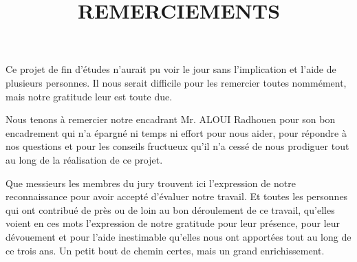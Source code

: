 \documentclass[a4paper,12pt]{report}
\begin{document}
\title{REMERCIEMENTS}


Ce projet de fin d'études n’aurait pu voir le jour sans l’implication et l’aide de plusieurs personnes. Il nous serait difficile pour les remercier toutes nommément, mais notre gratitude leur est toute due.

Nous tenons à remercier notre encadrant Mr. ALOUI Radhouen pour son bon encadrement qui n’a épargné ni temps ni effort pour nous aider, pour répondre à nos questions et pour les conseils fructueux qu’il n’a cessé de nous prodiguer tout au long de la
réalisation de ce projet.


Que messieurs les membres du jury trouvent ici l’expression de notre  reconnaissance pour avoir accepté d’évaluer notre travail.
Et toutes les personnes qui ont contribué de près ou de loin au bon déroulement de ce travail, qu’elles voient en ces mots l’expression de notre gratitude pour leur présence, pour leur dévouement et pour l’aide inestimable qu’elles nous ont apportées tout au long de ce trois ans. Un petit bout de chemin certes, mais un grand enrichissement.
\end{document}
